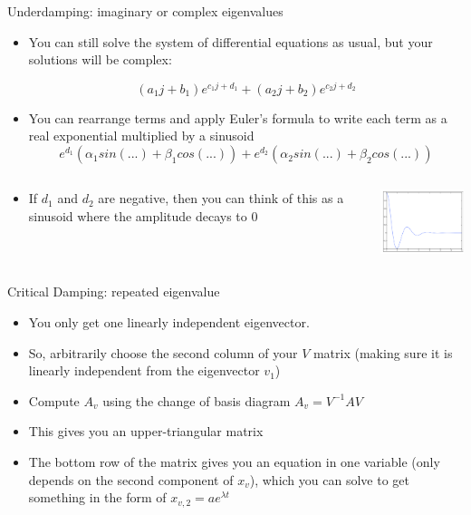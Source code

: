 \documentclass{beamer}
\begin{document}
	\begin{frame}{Underdamping: imaginary or complex eigenvalues}
	    \begin{itemize}
	        \item You can still solve the system of differential equations as usual, but your solutions will be complex:
            
            $$(a_1j + b_1)e^{c_1j + d_1} + (a_2j + b_2)e^{c_2j + d_2}$$
            
            \item You can rearrange terms and apply Euler’s formula to write each term as a real exponential multiplied by a sinusoid
            $$e^{d_1}(\alpha_1sin(...) + \beta_1cos(...)) + e^{d_2}(\alpha_2sin(...) + \beta_2cos(...))$$
            
            \item
            \begin{columns}[onlytextwidth,T]
            \column{\dimexpr\linewidth-40mm-5mm}
        	    If $d_1$ and $d_2$ are negative, then you can think of this as a sinusoid where the amplitude decays to 0
        	
        	\column{40mm}
        	    \includegraphics[width=40mm]{eigenvalue-types-2.png}
    	    \end{columns}
	    \end{itemize}
	\end{frame}
	
	\begin{frame}{Critical Damping: repeated eigenvalue}
	    \begin{itemize}
	        \item You only get one linearly independent eigenvector. 
            
            \item So, arbitrarily choose the second column of your $V$ matrix (making sure it is linearly independent from the eigenvector $v_1$)
            
            \item Compute $A_v$ using the change of basis diagram $A_v = V^{-1}AV$
            
            \item This gives you an upper-triangular matrix
            
            \item The bottom row of the matrix gives you an equation in one variable (only depends on the second component of $x_v$), which you can solve to get something in the form of $x_{v,2} = ae^{\lambda{t}}$
	    \end{itemize}
	\end{frame}
	
\end{document}
